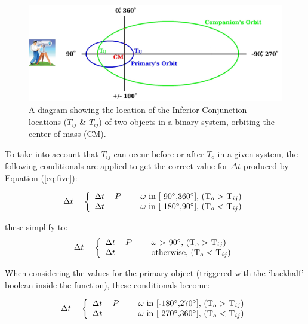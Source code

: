 \documentclass[12pt,preprint]{aastex}
\begin{document}
\begin{figure}[htp]
\begin{center}
\includegraphics[scale=0.31]{Figures/TcToEllipses2-withTelescope4.jpeg}
\caption[Binary Inferior Conjunction Diagram]{A diagram showing the location of the Inferior Conjunction locations ({\color{green}$T_{ij}$} \& {\color{blue}$T_{ij}$}) of two objects in a binary system, orbiting the center of mass ({\color{red}CM}).}
\label{fig:ToTcDiagram}
\end{center}
\end{figure}

To take into account that $T_{ij}$ can occur before or after $T_{o}$ in a given system, the following conditionals are applied to get the correct value for $\Delta t$ produced by Equation (\ref{eq:five}):

\begin{equation}\label{eq:ToTcCorrections1a}
\Delta t = \left\{ \begin{array}{l l} \Delta t-P& \quad \text{ $\omega$ in [ 90$^{\circ}$,360$^{\circ}$], (T$_o$ $>$ T$_{ij}$)}\\  \Delta t& \quad \text{ $\omega$ in [-180$^{\circ}$,90$^{\circ}$], (T$_o$ $<$ T$_{ij}$)} \end{array} \right.
\end{equation}

these simplify to:
\begin{equation}\label{eq:ToTcCorrections1b}
\Delta t = \left\{ \begin{array}{l l} \Delta t-P& \quad \text{ $\omega$ $>$ 90$^{\circ}$, (T$_o$ $>$ T$_{ij}$)}\\  \Delta t& \quad \text{ otherwise, (T$_o$ $<$ T$_{ij}$)} \end{array} \right.
\end{equation}

When considering the values for the primary object (triggered with the `backhalf' boolean inside the function), these conditionals become:

\begin{equation}\label{eq:ToTcCorrections2a}
\Delta t = \left\{ \begin{array}{l l} \Delta t-P& \quad \text{ $\omega$ in [-180$^{\circ}$,270$^{\circ}$], (T$_o$ $>$ T$_{ij}$)}\\  \Delta t& \quad \text{ $\omega$ in [ 270$^{\circ}$,360$^{\circ}$], (T$_o$ $<$ T$_{ij}$)} \end{array} \right.
\end{equation}
\end{document}
